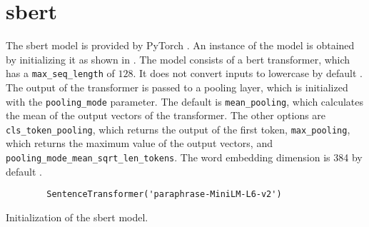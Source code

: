 \section{\ac{sbert}}\label{sec:impl-sbert}

The \ac{sbert} model is provided by PyTorch \cite{HfsentTrans2019}.
An instance of the model is obtained by initializing it as shown in .
The model consists of a \ac{bert} transformer, which has a \texttt{max\_seq\_length} of $128$. 
It does not convert inputs to lowercase by default \cite{sbert-dev}.
The output of the transformer is passed to a pooling layer, which is initialized with the \texttt{pooling\_mode} parameter.
The default is \texttt{mean\_pooling}, which calculates the mean of the output vectors of the transformer.
The other options are \texttt{cls\_token\_pooling}, which returns the output of the first token, 
\texttt{max\_pooling}, which returns the maximum value of the output vectors,
and \texttt{pooling\_mode\_mean\_sqrt\_len\_tokens}.
The word embedding dimension is 384 by default \cite{sbert-dev}.

\begin{listing}[htp]
    \begin{verbatim}
        SentenceTransformer('paraphrase-MiniLM-L6-v2')
    \end{verbatim}
    \caption{Initialization of the \ac{sbert} model.
    }
    \label{lst:impl-sbert}
\end{listing}